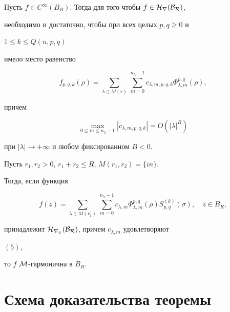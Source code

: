 \begin{lem} 


Пусть $f\in C^\infty(B_R)$. Тогда для того чтобы $f\in\cal H_r(B_R)$, 


необходимо и достаточно, чтобы при всех целых $p,q\ge0$ и 


$1\le k\le Q(n,p,q)$ 


имело место равенство 


$$ 


f_{p,q,k}(\rho)=\sum_{\lambda\in M(r)}\, 


\sum^{n_\lambda-1}_{m=0}c_{\lambda,m,p,q,k} 


\Phi^{p,q}_{\lambda,m}(\rho), 


$$ 


причем 


\begin{equation} 


\max_{0\le m\le n_\lambda-1}|c_{\lambda,m,p,q,k}|= 


O(|\lambda|^B) 


\end{equation} 


при $|\lambda|\to+\infty$ и любом фиксированном $B<0$.


\end{lem} 


 


\begin{lem} 


Пусть $r_1,r_2>0$, $r_1+r_2\le R$, $M(r_1,r_2)=\{in\}$. 


Тогда, если функция 


$$ 


f(z)=\sum_{\lambda\in M(r_1)}\, 


\sum^{n_\lambda-1}_{m=0}c_{\lambda,m} 


\Phi^{p,q}_{\lambda,m}(\rho)S^{(k)}_{p,q}(\sigma), 


\quad z\in B_R, 


$$ 


принадлежит $\cal H_{r_2}(B_R)$, причем $c_{\lambda,m}$ удовлетворяют 


$(5)$, 


то $f$ \; $\cal M$-гармонична в $B_R$. 


\end{lem} 


 


\section{Схема доказательства теоремы} 


